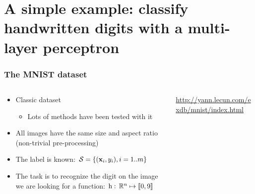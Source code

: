 \section{A simple example: classify handwritten digits with a multi-layer
  perceptron}

\begin{frame}
  \frametitle{The MNIST dataset}
  \begin{columns}
    \begin{column}{0.5\textwidth}
      \begin{itemize}
      \item Classic dataset
        \begin{itemize}
        \item Lots of methods have been tested with it
        \end{itemize}
      \item All images have the same size and aspect ratio (non-trivial
        pre-processing)
      \item The label is known: $\mathcal{S} = \left \lbrace {\ensuremath{\left ( {\mathbf{x}_{i}}, {y_{i}} \right )}} , {i=1..m} \right \rbrace$
      \item The task is to recognize the digit on the image \ie{} we are looking
        for a function: $\mathrm{h}: \, \mathbb{R}^{n} \mapsto \left \llbracket {0}, {9} \right \rrbracket$
      \end{itemize}
    \end{column}
    \begin{column}{0.5\textwidth}
      \url{http://yann.lecun.com/exdb/mnist/index.html}
    \end{column}
  \end{columns}
\end{frame}

